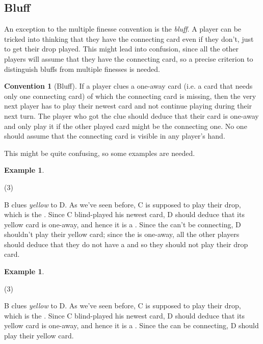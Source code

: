 \documentclass[a4paper]{article}
\theoremstyle{plain}
\theoremstyle{definition}
\newtheorem{example}[theorem]{Example}
\newtheorem{convention}[theorem]{Convention}
\begin{document}
\subsection{Bluff}

An exception to the multiple finesse convention is the \textit{bluff}. A player can be tricked into thinking that they have the connecting card even if they don't, just to get their drop played. This might lead into confusion, since all the other players will assume that they have the connecting card, so a precise criterion to distinguish bluffs from multiple finesses is needed.

\begin{convention}[Bluff]
	If a player clues a one-away card (i.e. a card that needs only one connecting card) of which the connecting card is missing, then the very next player has to play their newest card and not continue playing during their next turn. The player who got the clue should deduce that their card is one-away and only play it if the other played card might be the connecting one. No one should assume that the connecting card is visible in any player's hand.
\end{convention}

This might be quite confusing, so some examples are needed.

\begin{example}
	\hfill
	\begin{tasks}(3)
		\task[+]      
		\task[A]    
		\task[B]    
		\task[C]    
		\task[D]    
		\task[E]    
	\end{tasks}
	
	B clues \textit{yellow} to D. As we've seen before, C is supposed to play their drop, which is the . Since C blind-played his newest card, D should deduce that its yellow card is one-away, and hence it is a . Since the  can't be connecting, D shouldn't play their yellow card; since the  is one-away, all the other players should deduce that they do not have a  and so they should not play their drop card.
\end{example}

\begin{example}
	\hfill
	\begin{tasks}(3)
		\task[+]      
		\task[A]    
		\task[B]    
		\task[C]    
		\task[D]    
		\task[E]    
	\end{tasks}
	
	B clues \textit{yellow} to D. As we've seen before, C is supposed to play their drop, which is the . Since C blind-played his newest card, D should deduce that its yellow card is one-away, and hence it is a . Since the  can be connecting, D should play their yellow card.
\end{example}
\end{document}

